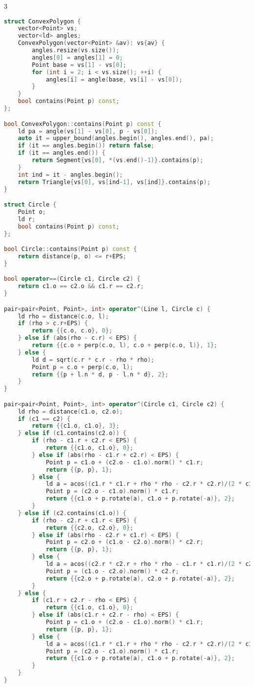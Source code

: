 \documentclass[10pt,a4paper,landscape,twosided]{extarticle}
\begin{document}
\begin{multicols}{3}
\begin{lstlisting}[language=C++]
struct ConvexPolygon {
    vector<Point> vs;
    vector<ld> angles;
    ConvexPolygon(vector<Point> &av): vs{av} {
        angles.resize(vs.size());
        angles[0] = angles[1] = 0;
        Point base = vs[1] - vs[0];
        for (int i = 2; i < vs.size(); ++i) {
            angles[i] = angle(base, vs[i] - vs[0]);
        }
    }
    bool contains(Point p) const;
};

bool ConvexPolygon::contains(Point p) const {
    ld pa = angle(vs[1] - vs[0], p - vs[0]);
    auto it = upper_bound(angles.begin(), angles.end(), pa);
    if (it == angles.begin()) return false;
    if (it == angles.end()) {
        return Segment{vs[0], *(vs.end()-1)}.contains(p);
    }
    int ind = it - angles.begin();
    return Triangle{vs[0], vs[ind-1], vs[ind]}.contains(p);
}

struct Circle {
    Point o;
    ld r;
    bool contains(Point p) const;
};

bool Circle::contains(Point p) const {
    return distance(p, o) <= r+EPS;
}

bool operator==(Circle c1, Circle c2) {
    return c1.o == c2.o && c1.r == c2.r;
}

pair<pair<Point, Point>, int> operator^(Line l, Circle c) {
    ld rho = distance(c.o, l);
    if (rho > c.r+EPS) {
        return {{c.o, c.o}, 0};
    } else if (abs(rho - c.r) < EPS) {
        return {{c.o + perp(c.o, l), c.o + perp(c.o, l)}, 1};
    } else {
        ld d = sqrt(c.r * c.r - rho * rho);
        Point p = c.o + perp(c.o, l);
        return {{p + l.n * d, p - l.n * d}, 2};
    }
}

pair<pair<Point, Point>, int> operator^(Circle c1, Circle c2) {
    ld rho = distance(c1.o, c2.o);
    if (c1 == c2) {
        return {{c1.o, c1.o}, 3};
    } else if (c1.contains(c2.o)) {
        if (rho - c1.r + c2.r < EPS) {
            return {{c1.o, c1.o}, 0};
        } else if (abs(rho - c1.r + c2.r) < EPS) {
            Point p = c1.o + (c2.o - c1.o).norm() * c1.r;
            return {{p, p}, 1};
        } else {
            ld a = acos((c1.r * c1.r + rho * rho - c2.r * c2.r)/(2 * c1.r * rho));
            Point p = (c2.o - c1.o).norm() * c1.r;
            return {{c1.o + p.rotate(a), c1.o + p.rotate(-a)}, 2};
        }
    } else if (c2.contains(c1.o)) {
        if (rho - c2.r + c1.r < EPS) {
            return {{c2.o, c2.o}, 0};
        } else if (abs(rho - c2.r + c1.r) < EPS) {
            Point p = c2.o + (c1.o - c2.o).norm() * c2.r;
            return {{p, p}, 1};
        } else {
            ld a = acos((c2.r * c2.r + rho * rho - c1.r * c1.r)/(2 * c2.r * rho));
            Point p = (c1.o - c2.o).norm() * c2.r;
            return {{c2.o + p.rotate(a), c2.o + p.rotate(-a)}, 2};
        }
    } else {
        if (c1.r + c2.r - rho < EPS) {
            return {{c1.o, c1.o}, 0};
        } else if (abs(c1.r + c2.r - rho) < EPS) {
            Point p = c1.o + (c2.o - c1.o).norm() * c1.r;
            return {{p, p}, 1};
        } else {
            ld a = acos((c1.r * c1.r + rho * rho - c2.r * c2.r)/(2 * c1.r * rho));
            Point p = (c2.o - c1.o).norm() * c1.r;
            return {{c1.o + p.rotate(a), c1.o + p.rotate(-a)}, 2};
        }
    }
}


\end{lstlisting}
\end{multicols}
\end{document}
